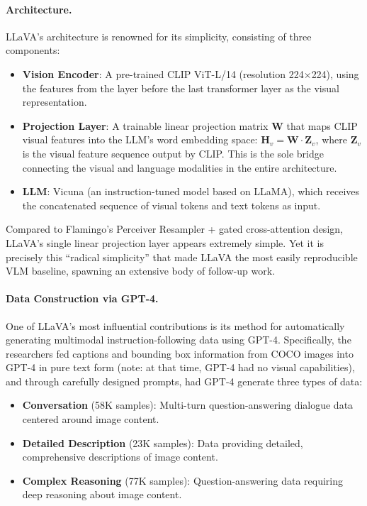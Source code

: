 \paragraph{Architecture.}
LLaVA's architecture is renowned for its simplicity, consisting of three components:
\begin{itemize}[leftmargin=2em]
  \item \textbf{Vision Encoder}:
    A pre-trained CLIP ViT-L/14 (resolution 224$\times$224),
    using the features from the layer before the last transformer layer as the visual representation.
  \item \textbf{Projection Layer}:
    A trainable linear projection matrix $\mathbf{W}$
    that maps CLIP visual features into the LLM's word embedding space:
    $\mathbf{H}_v = \mathbf{W} \cdot \mathbf{Z}_v$,
    where $\mathbf{Z}_v$ is the visual feature sequence output by CLIP.
    This is the sole bridge connecting the visual and language modalities in the entire architecture.
  \item \textbf{LLM}:
    Vicuna \cite{chiang2023vicuna} (an instruction-tuned model based on LLaMA),
    which receives the concatenated sequence of visual tokens and text tokens as input.
\end{itemize}

\noindent
Compared to Flamingo's Perceiver Resampler + gated cross-attention design,
LLaVA's single linear projection layer appears extremely simple.
Yet it is precisely this ``radical simplicity'' that made LLaVA the most easily reproducible VLM baseline,
spawning an extensive body of follow-up work.

\paragraph{Data Construction via GPT-4.}
One of LLaVA's most influential contributions is its method for automatically generating multimodal instruction-following data using GPT-4.
Specifically, the researchers fed captions and bounding box information from COCO \cite{lin2014coco} images
into GPT-4 in pure text form (note: at that time, GPT-4 had no visual capabilities),
and through carefully designed prompts, had GPT-4 generate three types of data:

\begin{itemize}[leftmargin=2em]
  \item \textbf{Conversation} (58K samples):
    Multi-turn question-answering dialogue data centered around image content.
  \item \textbf{Detailed Description} (23K samples):
    Data providing detailed, comprehensive descriptions of image content.
  \item \textbf{Complex Reasoning} (77K samples):
    Question-answering data requiring deep reasoning about image content.
\end{itemize}

